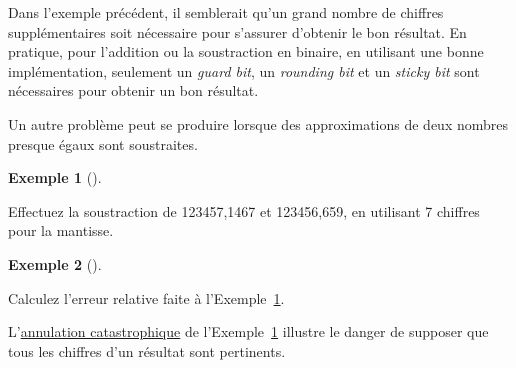 \documentclass[
  letterpaper,
]{scrbook}
\theoremstyle{plain}
\theoremstyle{definition}
\theoremstyle{definition}
\newtheorem{example}{Exemple}[chapter]
\theoremstyle{remark}
\begin{document}
\begin{tcolorbox}[enhanced jigsaw, colbacktitle=quarto-callout-warning-color!10!white, toptitle=1mm, left=2mm, toprule=.15mm, opacityback=0, bottomrule=.15mm, breakable, coltitle=black, title=\textcolor{quarto-callout-warning-color}{\faExclamationTriangle}\hspace{0.5em}{Attention}, colframe=quarto-callout-warning-color-frame, arc=.35mm, titlerule=0mm, rightrule=.15mm, opacitybacktitle=0.6, leftrule=.75mm, bottomtitle=1mm, colback=white]

Dans l'exemple précédent, il semblerait qu'un grand nombre de chiffres
supplémentaires soit nécessaire pour s'assurer d'obtenir le bon
résultat. En pratique, pour l'addition ou la soustraction en binaire, en
utilisant une bonne implémentation, seulement un \emph{guard bit}, un
\emph{rounding bit} et un \emph{sticky bit} sont nécessaires pour
obtenir un bon résultat.

\end{tcolorbox}

Un autre problème peut se produire lorsque des approximations de deux
nombres presque égaux sont soustraites.

\begin{example}[]\protect\hypertarget{exm-soustraction-deux-nombres-presque-egaux}{}\label{exm-soustraction-deux-nombres-presque-egaux}

Effectuez la soustraction de 123457,1467 et 123456,659, en utilisant 7
chiffres pour la mantisse.

\end{example}

\begin{example}[]\protect\hypertarget{exm-soustraction-deux-nombres-presque-egaux-erreur}{}\label{exm-soustraction-deux-nombres-presque-egaux-erreur}

Calculez l'erreur relative faite à
l'Exemple~\ref{exm-soustraction-deux-nombres-presque-egaux}.

\end{example}

\begin{tcolorbox}[enhanced jigsaw, colbacktitle=quarto-callout-warning-color!10!white, toptitle=1mm, left=2mm, toprule=.15mm, opacityback=0, bottomrule=.15mm, breakable, coltitle=black, title=\textcolor{quarto-callout-warning-color}{\faExclamationTriangle}\hspace{0.5em}{Attention}, colframe=quarto-callout-warning-color-frame, arc=.35mm, titlerule=0mm, rightrule=.15mm, opacitybacktitle=0.6, leftrule=.75mm, bottomtitle=1mm, colback=white]

L'\href{https://www.wikiwand.com/en/Catastrophic_cancellation}{annulation
catastrophique} de
l'Exemple~\ref{exm-soustraction-deux-nombres-presque-egaux} illustre le
danger de supposer que tous les chiffres d'un résultat sont pertinents.

\end{tcolorbox}
\end{document}
